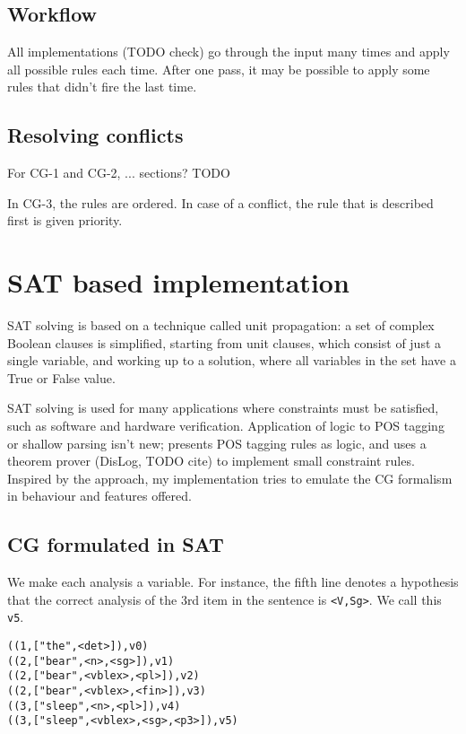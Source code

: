 \documentclass[a4paper, 11pt]{article}
\begin{document}
\subsection{Workflow}

All implementations (TODO check) go through the input many times and apply all possible rules each time. 
After one pass, it may be possible to apply some rules that didn't fire the last time.


\subsection{Resolving conflicts}

For CG-1 and CG-2, ... sections? TODO

In CG-3, the rules are ordered. In case of a conflict, the rule that is described first is given priority.


\section{SAT based implementation}

SAT solving is based on a technique called unit propagation:
a set of complex Boolean clauses is simplified, starting from unit
clauses, which consist of just a single variable, and working up to a
solution, where all variables in the set have a True or False value.

SAT solving is used for many applications where constraints must be
satisfied, such as software and hardware verification.
Application of logic to POS tagging or shallow parsing isn't new;
\cite{lager1998, lager2000} presents POS tagging rules as logic, and uses
a theorem prover (DisLog, TODO cite) to implement small constraint rules.
Inspired by the approach, my implementation tries to emulate the CG
formalism in behaviour and features offered.



\subsection{CG formulated in SAT}

We make each analysis a variable. For instance, the fifth line denotes
a hypothesis that the correct analysis of the 3rd item in the sentence
is \texttt{<V,Sg>}. We call this \texttt{v5}.

\begin{lstlisting}
((1,["the",<det>]),v0)
((2,["bear",<n>,<sg>]),v1)
((2,["bear",<vblex>,<pl>]),v2)
((2,["bear",<vblex>,<fin>]),v3)
((3,["sleep",<n>,<pl>]),v4)
((3,["sleep",<vblex>,<sg>,<p3>]),v5)
\end{lstlisting}
\end{document}
